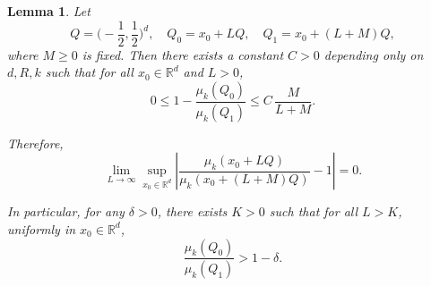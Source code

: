 \documentclass[10pt,a4paper]{amsart}
\newtheorem{lemma}[theorem]{Lemma}
\begin{document}
\setcounter{section}{4}
\setcounter{theorem}{0}
\setcounter{equation}{23}
\begin{lemma}\label{L4001}
Let
\[
Q=\biggl(-\frac12,\frac12\biggr)^d,\quad Q_0=x_0+LQ,\quad Q_1=x_0+(L+M)Q,
\]
where $M\ge 0$ is fixed. Then there exists a constant $C>0$ depending only on $d,R,k$ such that for all $x_0\in\mathbb{R}^d$ and $L>0$,
\begin{equation}\label{E4001}
0\le 1-\frac{\mu_k(Q_0)}{\mu_k(Q_1)}\le C\,\frac{M}{L+M}.
\end{equation}

Therefore,
\begin{equation}\label{E4002}
\lim_{L\to\infty}\sup_{x_0\in\mathbb{R}^d}\left|\frac{\mu_k(x_0+LQ)}{\mu_k(x_0+(L+M)Q)}-1\right|=0.
\end{equation}

In particular, for any $\delta>0$, there exists $K>0$ such that for all $L>K$, uniformly in $x_0\in\mathbb{R}^d$,
\[
\frac{\mu_k(Q_0)}{\mu_k(Q_1)}>1-\delta.
\]

\end{lemma}
\end{document}
